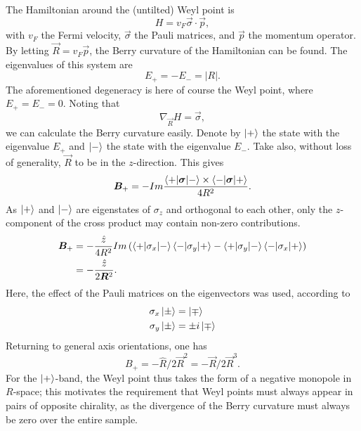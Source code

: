 The Hamiltonian around the (untilted) Weyl point is
\begin{equation}
  H = v_F \vec{\sigma} \cdot \vec{p},
\end{equation}
with $v_F$ the Fermi velocity, $\vec{\sigma}$ the Pauli matrices, and $\vec{p}$ the momentum operator.
By letting $\vec{R} = v_F \vec{p}$, the Berry curvature of the Hamiltonian can be found.
The eigenvalues of this system are
\begin{equation}
    E_+ = -E_-
    = |R|.
\end{equation}
The aforementioned degeneracy is here of course the Weyl point, where $E_+ = E_- = 0$.
Noting that
\begin{equation}
  \label{eq:gradHamil}
  \nabla_{\vec{R}} H = \vec\sigma,
\end{equation}
we can calculate the Berry curvature easily.
Denote by $\ket{+}$ the state with the eigenvalue $E_+$ and $\ket{-}$ the state with the eigenvalue $E_-$.
Take also, without loss of generality, $\vec{R}$ to be in the $z$-direction.
This gives
\begin{equation}
  \bm{B}_+ = -Im
  \frac{
    \braket{+ | \bm\sigma | -}
    \times
    \braket{- | \bm\sigma | +}
  }{
    4 R^2
  }.
\end{equation}
As $\ket{+}$ and $\ket{-}$ are eigenstates of $\sigma_z$ and orthogonal to each other, only the $z$-component of the cross product may contain non-zero contributions.
\begin{equation}
  \begin{split}
    \bm{B}_+ &= - \frac{\hat{z}}{4 R^2}
    Im \left(
    \braket{+ | \sigma_x | -}
    \braket{- | \sigma_y | +}
    -
    \braket{+ | \sigma_y | -}
    \braket{- | \sigma_x | +}
    \right)\\
    &= - \frac{ \hat{z}}{2 \bm{R}^2}.
  \end{split}
\end{equation}
Here, the effect of the Pauli matrices on the eigenvectors was used, according to
\begin{align}
  \sigma_x \ket{\pm} &= \ket{\mp}\\
  \sigma_y \ket{\pm} &= \pm i \ket{\mp}
\end{align}
Returning to general axis orientations, one has
\begin{equation}
  B_+ = - \hat{R} / 2\vec{R}^2 = - \vec{R} / 2 \vec{R}^3.
\end{equation}
For the $\ket{+}$-band, the Weyl point thus takes the form of a negative monopole in $R$-space;
this motivates the requirement that Weyl points must always appear in pairs of opposite chirality, as the divergence of the Berry curvature must always be zero over the entire sample.

